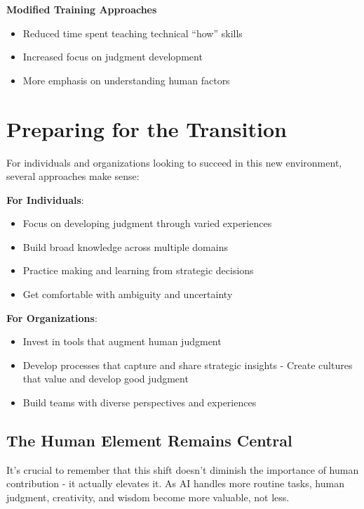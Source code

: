 \documentclass[
  Letterpaper,
]{scrbook}
\providecommand{\tightlist}{%
  \setlength{\itemsep}{0pt}\setlength{\parskip}{0pt}}\usepackage{longtable,booktabs,array}
\begin{document}
\textbf{Modified Training Approaches}

\begin{itemize}
\tightlist
\item
  Reduced time spent teaching technical ``how'' skills
\item
  Increased focus on judgment development
\item
  More emphasis on understanding human factors
\end{itemize}

\section{Preparing for the
Transition}\label{preparing-for-the-transition}

For individuals and organizations looking to succeed in this new
environment, several approaches make sense:

\textbf{For Individuals}:

\begin{itemize}
\tightlist
\item
  Focus on developing judgment through varied experiences
\item
  Build broad knowledge across multiple domains
\item
  Practice making and learning from strategic decisions
\item
  Get comfortable with ambiguity and uncertainty
\end{itemize}

\textbf{For Organizations}:

\begin{itemize}
\tightlist
\item
  Invest in tools that augment human judgment
\item
  Develop processes that capture and share strategic insights - Create
  cultures that value and develop good judgment
\item
  Build teams with diverse perspectives and experiences
\end{itemize}

\subsection{The Human Element Remains
Central}\label{the-human-element-remains-central}

It's crucial to remember that this shift doesn't diminish the importance
of human contribution - it actually elevates it. As AI handles more
routine tasks, human judgment, creativity, and wisdom become more
valuable, not less.
\end{document}
